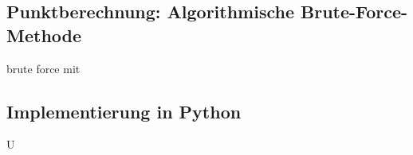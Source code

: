 \subsection{Punktberechnung: Algorithmische Brute-Force-Methode}
brute force mit


\subsection{Implementierung in Python}
U




































